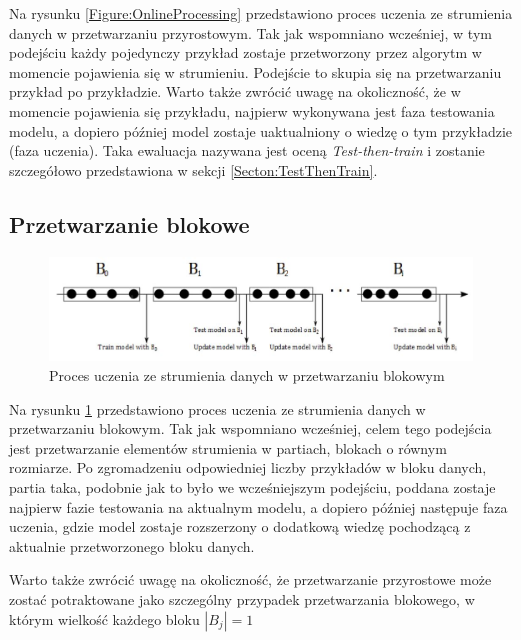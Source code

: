 \noindent Na rysunku \ref{Figure:OnlineProcessing} przedstawiono proces uczenia ze strumienia danych w przetwarzaniu przyrostowym. Tak jak wspomniano wcześniej, w tym podejściu każdy pojedynczy przykład zostaje przetworzony przez algorytm w momencie pojawienia się w strumieniu. Podejście to skupia się na przetwarzaniu przykład po przykładzie. Warto także zwrócić uwagę na okoliczność, że w momencie pojawienia się przykładu, najpierw wykonywana jest faza testowania modelu, a dopiero później model zostaje uaktualniony o wiedzę o tym przykładzie (faza uczenia). Taka ewaluacja nazywana jest oceną \textit{Test-then-train} i zostanie szczegółowo przedstawiona w sekcji \ref{Secton:TestThenTrain}.

\newpage

\subsection{Przetwarzanie blokowe}

\begin{figure}[h] 
    \centering
    \includegraphics[width=15cm]{figures/block_processing.JPG}
    \caption{Proces uczenia ze strumienia danych w przetwarzaniu blokowym \cite{BrzezPhd2015}}\label{Figure:BlockProcessing}
\end{figure}

\noindent Na rysunku \ref{Figure:BlockProcessing} przedstawiono proces uczenia ze strumienia danych w przetwarzaniu blokowym. Tak jak wspomniano wcześniej, celem tego podejścia jest przetwarzanie elementów strumienia w partiach, blokach o równym rozmiarze. Po zgromadzeniu odpowiedniej liczby przykładów w bloku danych, partia taka, podobnie jak to było we wcześniejszym podejściu, poddana zostaje najpierw fazie testowania na aktualnym modelu, a dopiero później następuje faza uczenia, gdzie model zostaje rozszerzony o dodatkową wiedzę pochodzącą z aktualnie przetworzonego bloku danych.

\noindent Warto także zwrócić uwagę na okoliczność, że przetwarzanie przyrostowe może zostać potraktowane jako szczególny przypadek przetwarzania blokowego, w którym wielkość każdego bloku $|B_j| = 1$

